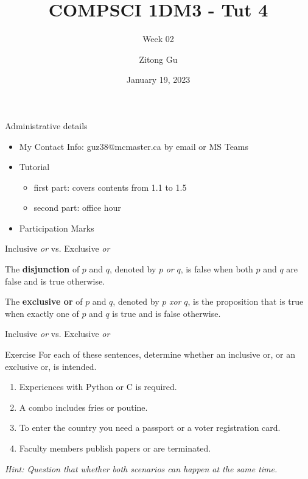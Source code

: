 \documentclass{beamer}
\title{COMPSCI 1DM3 - Tut 4}
\subtitle{Week 02}
\author{Zitong Gu}
\institute{McMaster University}
\date{January 19, 2023}
\begin{document}
\maketitle

\begin{frame}{Administrative details}
    \begin{itemize}
        \item My Contact Info: guz38@mcmaster.ca by email or MS Teams
        \item Tutorial
        \begin{itemize}
            \item first part: covers contents from 1.1 to 1.5
            \item second part: office hour
        \end{itemize}
        \item Participation Marks
        
    \end{itemize}
\end{frame}

\begin{frame}{Inclusive \textit{or} vs. Exclusive \textit{or}}
    \begin{definition}
        The \textbf{disjunction} of $p$ and $q$, denoted by $p$ \textit{or} $q$, is false when both $p$ and $q$ are false and is true otherwise. 
    \end{definition}
    
    \begin{definition}
        The \textbf{exclusive or} of $p$ and $q$, denoted by $p$ \textit{xor} $q$, is the proposition that is true when exactly one of $p$ and $q$ is true and is false otherwise.  
    \end{definition}
\end{frame}

\begin{frame}[t]{Inclusive \textit{or} vs. Exclusive \textit{or}}
    \begin{block}{Exercise}
        For each of these sentences, determine whether an inclusive or, or an exclusive or, is intended. 
        \begin{enumerate}[1]
            \item Experiences with Python or C is required.
            \item A combo includes fries or poutine.
            \item To enter the country you need a passport or a voter registration card.
            \item Faculty members publish papers or are terminated.
        \end{enumerate}
        \textit{Hint: Question that whether both scenarios can happen at the same time. }
    \end{block}
\end{frame}
\end{document}
